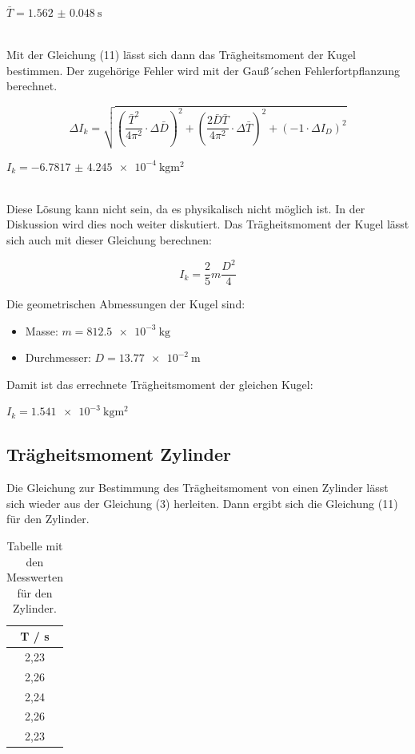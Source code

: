  \centerline{$\bar{T} = \SI{1.562(48)}{\second}$}\ \\

 Mit der Gleichung (11) lässt sich dann das Trägheitsmoment der Kugel bestimmen. Der
 zugehörige Fehler wird mit der Gauß´schen Fehlerfortpflanzung berechnet.

\begin{equation}
 \Delta I_k = \sqrt{\left(\frac{\bar{T}^2}{4\pi^2} \cdot \Delta \bar{D} \right)^2
  + \left(\frac{2\bar{D}\bar{T}}{4\pi^2} \cdot \Delta \bar{T} \right)^2
   + \left( -1 \cdot \Delta I_D \right)^2}
\end{equation}

\centerline{$I_k = \SI{-6.7817(42450)e-4}{\kilo\gram\meter\squared}$}\ \\

Diese Lösung kann nicht sein, da es physikalisch nicht möglich ist. In der Diskussion
wird dies noch weiter diskutiert.
Das Trägheitsmoment der Kugel lässt sich auch mit dieser Gleichung berechnen:

\begin{equation}
I_k = \frac{2}{5} m \frac{D^2}{4}
\end{equation}

Die geometrischen Abmessungen der Kugel sind:

\begin{itemize}
  \item Masse: $m = \SI{812.5e-3}{\kilo\gram}$
  \item Durchmesser: $D = \SI{13.77e-2}{\meter}$
\end{itemize}

Damit ist das errechnete Trägheitsmoment der gleichen Kugel:

\centerline{$I_k = \SI{1.541e-3}{\kilo\gram\meter\squared}$}

\subsection{Trägheitsmoment Zylinder}

Die Gleichung zur Bestimmung des Trägheitsmoment von einen Zylinder lässt sich wieder
aus der Gleichung (3) herleiten. Dann ergibt sich die Gleichung (11) für den Zylinder.


\begin{table}[H]
  \centering
  \caption{Tabelle mit den Messwerten für den Zylinder.}
  \begin{tabular}{c}
    \toprule
    T / \si{\second} \\
    \midrule
    2,23 \\
    2,26 \\
    2,24 \\
    2,26 \\
    2,23 \\
    \bottomrule
  \end{tabular}
\end{table}

